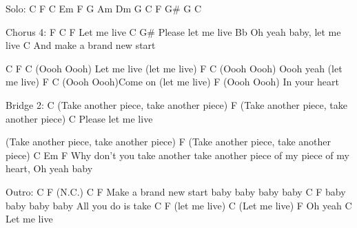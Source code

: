 \begin{multicols}{2}
\begin{lstsong}
Solo:
C F 
C Em F G
Am Dm G C
F G# G C

Chorus 4:
F                C F
     Let me live
   C         G#
Please let me live 
                 Bb
Oh yeah baby, let me live 
                       C
And make a brand new start 

C       F                         C
(Oooh Oooh)   Let me live (let me live) 
        F                      C
(Oooh Oooh) Oooh yeah (let me live) 
         F                   C
(Oooh Oooh)Come on (let me live)
         F          
(Oooh Oooh) In your heart 




Bridge 2:
        C
(Take another piece, take another piece) 
        F
(Take another piece, take another piece)
C
Please let me live 

(Take another piece, take another piece) 
        F
(Take another piece, take another piece)
             C                         Em F
Why don't you take another take another piece of my piece of my heart, 
Oh yeah baby 

Outro:
C  F  (N.C.)
                 C                    F
Make a brand new start baby baby baby baby 
                C                 F
baby baby baby baby All you do is take 
         C              F
(let me live) 
         C
(Let me live) 
          F
Oh yeah 
        C
Let me live
\end{lstsong}
\end{multicols}
\newpage


